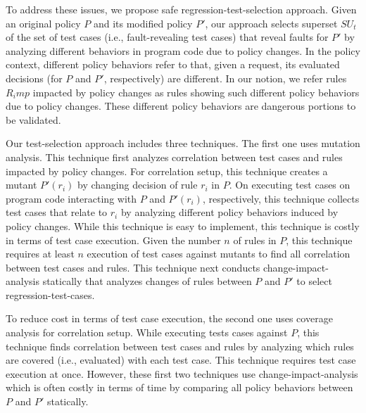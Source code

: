 To address these issues, we propose safe regression-test-selection approach.
Given an original 
policy $P$ and its modified policy $P'$,
our approach selects superset $SU_t$ of the set of test cases (i.e., fault-revealing test cases) that reveal
faults for $P'$ by analyzing different behaviors in program code due to policy changes.
In the policy context, different policy 
behaviors refer to that, given a request, its evaluated decisions (for $P$ and $P'$, respectively) are different.
In our notion, we refer rules $R_imp$ impacted by policy changes as rules showing such different policy behaviors due to policy changes.
These different policy behaviors are dangerous portions to be validated.



Our test-selection approach includes three techniques.
The first one uses mutation analysis.
This technique first analyzes correlation between test cases and rules impacted by policy changes.
For correlation setup, this technique creates a mutant $P'(r_i)$
by changing decision of rule $r_i$ in $P$. On executing
test cases on program code interacting with $P$ and $P'(r_i)$,
respectively, this technique collects test cases that relate to $r_i$
by analyzing different policy behaviors induced by policy changes.
While this technique is easy to implement, this technique is costly
in terms of test case execution.
Given the number $n$ of rules in $P$, this technique requires at least
$n$ execution of test cases against mutants to find all correlation between
test cases and rules. This technique next conducts change-impact-analysis statically that analyzes changes of rules between $P$ and $P'$
to select regression-test-cases.
 
To reduce cost in terms of test case execution, the second one uses coverage analysis
for correlation setup.
While executing tests cases against $P$, this technique finds correlation between
test cases and rules by analyzing which rules are covered (i.e., evaluated) with each test
case. This technique requires test case execution at once.
However, these first two techniques use change-impact-analysis which is often
costly in terms of time by comparing all policy behaviors between $P$ and $P'$ statically.

